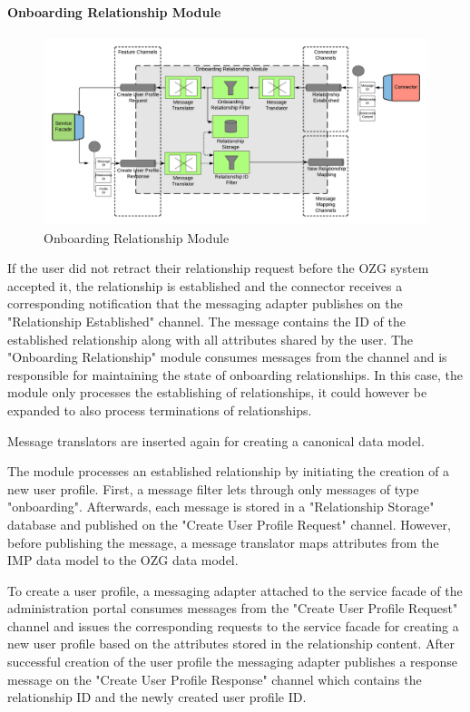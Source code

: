 \paragraph{Onboarding Relationship Module}

\begin{figure}[H]
    \centering
    \includegraphics[scale=0.6]{Diagrams/Integration Architecture 1/Technological Integration/8. Onboarding Relationship Module.pdf}
    \caption{Onboarding Relationship Module}
    \label{integration1:onboarding_relationship_module}
\end{figure}

If the user did not retract their relationship request before the OZG system accepted it, the relationship is established and the connector receives a corresponding notification that the messaging adapter publishes on the "Relationship Established" channel. The message contains the ID of the established relationship along with all attributes shared by the user. The "Onboarding Relationship" module consumes messages from the channel and is responsible for maintaining the state of onboarding relationships. In this case, the module only processes the establishing of relationships, it could however be expanded to also process terminations of relationships.

Message translators are inserted again for creating a canonical data model.

The module processes an established relationship by initiating the creation of a new user profile. First, a message filter lets through only messages of type "onboarding". Afterwards, each message is stored in a "Relationship Storage" database and published on the "Create User Profile Request" channel. However, before publishing the message, a message translator maps attributes from the IMP data model to the OZG data model.

To create a user profile, a messaging adapter attached to the service facade of the administration portal consumes messages from the "Create User Profile Request" channel and issues the corresponding requests to the service facade for creating a new user profile based on the attributes stored in the relationship content. After successful creation of the user profile the messaging adapter publishes a response message on the "Create User Profile Response" channel which contains the relationship ID and the newly created user profile ID.


